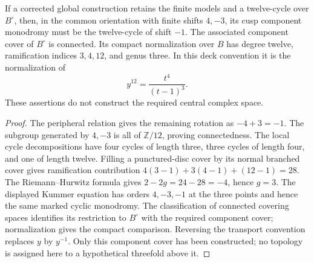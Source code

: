 \begin{proposition}\label{push:B32}
If a corrected global construction retains the
finite models and a twelve-cycle over
$B^\circ$, then, in the common orientation
with finite shifts $4,-3$, its cusp
component monodromy must be the twelve-cycle
of shift $-1$. The associated component
cover of $B^\circ$ is connected. Its compact
normalization over $B$ has degree twelve,
ramification indices $3,4,12$, and genus
three. In this deck convention it is the
normalization of
\[
 y^{12}=\frac{t^4}{(t-1)^3}.
\]
These assertions do not construct
the required central complex space.
\end{proposition}
\begin{proof}
The peripheral relation gives the remaining
rotation as $-4+3=-1$. The subgroup generated
by $4,-3$ is all of $\mathbb Z/12$, proving
connectedness. The local cycle decompositions
have four cycles of length three, three
cycles of length four, and one of length
twelve. Filling a punctured-disc cover by
its normal branched cover gives ramification
contribution
$4(3-1)+3(4-1)+(12-1)=28$.
The Riemann--Hurwitz formula gives
$2-2g=24-28=-4$, hence $g=3$.
The displayed Kummer equation has orders
$4,-3,-1$ at the three points and hence
the same marked cyclic monodromy. The
classification of connected covering
spaces identifies its restriction to
$B^\circ$ with the required component
cover; normalization gives the compact
comparison. Reversing the transport
convention replaces $y$ by $y^{-1}$.
Only this component cover has been
constructed; no topology is assigned here
to a hypothetical threefold above it.
\end{proof}

